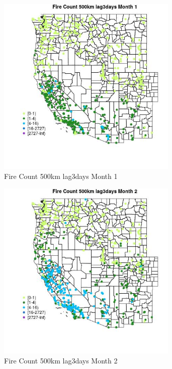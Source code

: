 \begin{figure} 
\centering  
\includegraphics[width=0.77\textwidth]{Code_Outputs/Report_ML_input_PM25_Step4_part_f_de_duplicated_aves_prioritize_24hr_obswNAs_MapObsMo1Fire_Count_500km_lag3days.jpg} 
\caption{\label{fig:Report_ML_input_PM25_Step4_part_f_de_duplicated_aves_prioritize_24hr_obswNAsMapObsMo1Fire_Count_500km_lag3days}Fire Count 500km lag3days Month 1} 
\end{figure} 
 

\begin{figure} 
\centering  
\includegraphics[width=0.77\textwidth]{Code_Outputs/Report_ML_input_PM25_Step4_part_f_de_duplicated_aves_prioritize_24hr_obswNAs_MapObsMo2Fire_Count_500km_lag3days.jpg} 
\caption{\label{fig:Report_ML_input_PM25_Step4_part_f_de_duplicated_aves_prioritize_24hr_obswNAsMapObsMo2Fire_Count_500km_lag3days}Fire Count 500km lag3days Month 2} 
\end{figure} 
 


